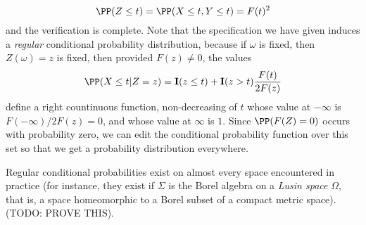 \begin{example}
    \[ \PP(Z \leq t) = \PP(X \leq t, Y \leq t) = F(t)^2 \]
    and the verification is complete. Note that the specification we have given induces a {\it regular} conditional probability distribution, because if $\omega$ is fixed, then $Z(\omega) = z$ is fixed, then provided $F(z) \neq 0$, the values
    \[ \PP(X \leq t|Z = z) = \mathbf{I}(z \leq t) + \mathbf{I}(z > t) \frac{F(t)}{2F(z)} \]
    define a right countinuous function, non-decreasing of $t$ whose value at $-\infty$ is $F(-\infty)/2F(z) = 0$, and whose value at $\infty$ is $1$. Since $\PP(F(Z) = 0)$ occurs with probability zero, we can edit the conditional probability function over this set so that we get a probability distribution everywhere.
\end{example}

Regular conditional probabilities exist on almost every space encountered in practice (for instance, they exist if $\Sigma$ is the Borel algebra on a {\it Lusin space} $\Omega$, that is, a space homeomorphic to a Borel subset of a compact metric space). (TODO: PROVE THIS).

